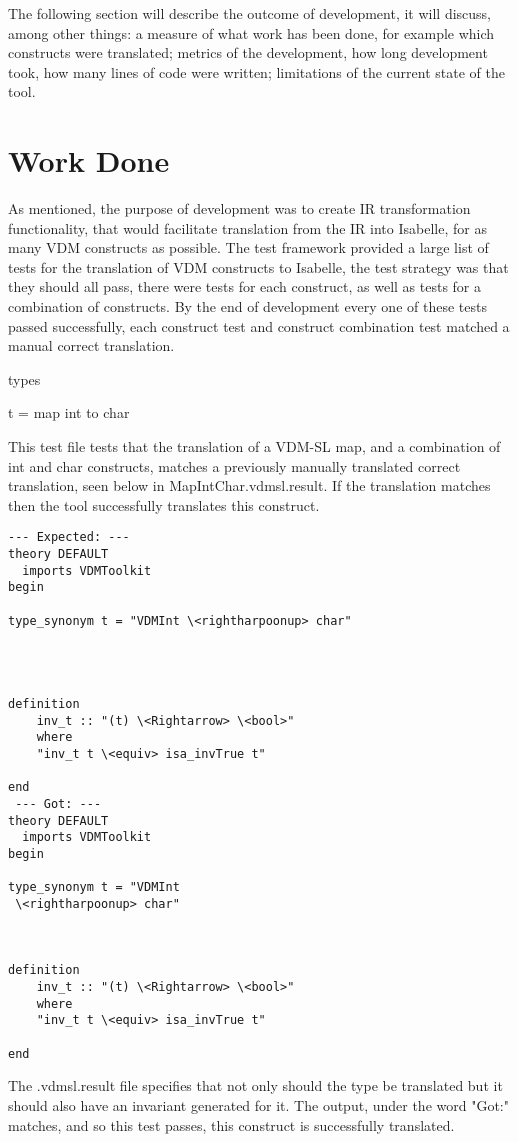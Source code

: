 The following section will describe the outcome of development, it will discuss, among other things: a measure of what work has been done, for example which constructs were translated; metrics of the development, how long development took, how many lines of code were written; limitations of the current state of the tool.

\section{Work Done} \label{wd}
As mentioned, the purpose of development was to create IR transformation functionality, that would facilitate translation from the IR into Isabelle, for as many VDM constructs as possible. The test framework provided a large list of tests for the translation of VDM constructs to Isabelle, the test strategy was that they should all pass, there were tests for each construct, as well as tests for a combination of constructs. By the end of development every one of these tests passed successfully, each construct test and construct combination test matched a manual correct translation.
\begin{vdmsl}[label=lst:MapIntChar.vdmsl, caption=The VDM-SL test file\, MapIntChar.vdmsl]
types

t = map int to char
\end{vdmsl} 

This test file tests that the translation of a VDM-SL map, and a combination of int and char constructs, matches a previously manually translated correct translation, seen below in MapIntChar.vdmsl.result. If the translation matches then the tool successfully translates this construct.

\begin{lstlisting}[language=Isabelle, label=lst:MapIntChar.vdmsl.result, caption=The MapIntChar.vdmsl.result file specifies that the below is the correct translation and the output of the tool applied to MapIntChar.vdmsl should match it.]
 --- Expected: ---
theory DEFAULT
  imports VDMToolkit
begin

type_synonym t = "VDMInt \<rightharpoonup> char"




definition
    inv_t :: "(t) \<Rightarrow> \<bool>"
    where
    "inv_t t \<equiv> isa_invTrue t"

end
 --- Got: ---
theory DEFAULT
  imports VDMToolkit
begin

type_synonym t = "VDMInt
 \<rightharpoonup> char"



definition
	inv_t :: "(t) \<Rightarrow> \<bool>"
    where
    "inv_t t \<equiv> isa_invTrue t"

end
\end{lstlisting}
The .vdmsl.result file specifies that not only should the type be translated but it should also have an invariant generated for it. The output, under the word "Got:" matches, and so this test passes, this construct is successfully translated.


